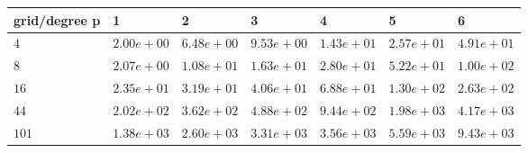 \begin{tabular}{lllllll}
\hline
 grid/degree p   & 1          & 2          & 3          & 4          & 5          & 6          \\
\hline
 $4$             & $2.00e+00$ & $6.48e+00$ & $9.53e+00$ & $1.43e+01$ & $2.57e+01$ & $4.91e+01$ \\
 $8$             & $2.07e+00$ & $1.08e+01$ & $1.63e+01$ & $2.80e+01$ & $5.22e+01$ & $1.00e+02$ \\
 $16$            & $2.35e+01$ & $3.19e+01$ & $4.06e+01$ & $6.88e+01$ & $1.30e+02$ & $2.63e+02$ \\
 $44$            & $2.02e+02$ & $3.62e+02$ & $4.88e+02$ & $9.44e+02$ & $1.98e+03$ & $4.17e+03$ \\
 $101$           & $1.38e+03$ & $2.60e+03$ & $3.31e+03$ & $3.56e+03$ & $5.59e+03$ & $9.43e+03$ \\
\hline
\end{tabular}